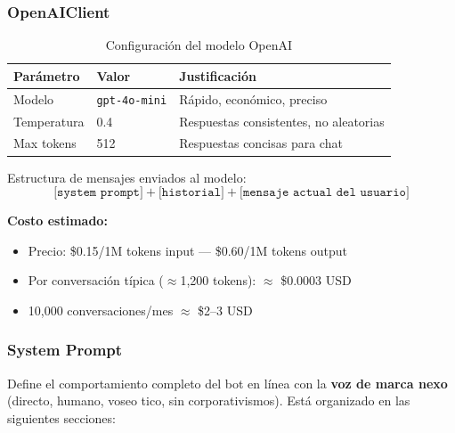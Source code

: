 \documentclass[12pt,a4paper]{article}
\begin{document}
\subsubsection*{OpenAIClient}

\begin{table}[H]
\centering
\begin{tabular}{@{}lll@{}}
\toprule
\textbf{Parámetro} & \textbf{Valor} & \textbf{Justificación} \\
\midrule
Modelo & \texttt{gpt-4o-mini} & Rápido, económico, preciso \\
Temperatura & 0.4 & Respuestas consistentes, no aleatorias \\
Max tokens & 512 & Respuestas concisas para chat \\
\bottomrule
\end{tabular}
\caption{Configuración del modelo OpenAI}
\end{table}

Estructura de mensajes enviados al modelo:
\[\texttt{[system prompt]} + \texttt{[historial]} + \texttt{[mensaje actual del usuario]}\]

\textbf{Costo estimado:}
\begin{itemize}
  \item Precio: \$0.15/1M tokens input — \$0.60/1M tokens output
  \item Por conversación típica ($\approx$1,200 tokens): $\approx$ \$0.0003 USD
  \item 10,000 conversaciones/mes $\approx$ \$2--3 USD
\end{itemize}

\subsubsection*{System Prompt}

Define el comportamiento completo del bot en línea con la \textbf{voz de marca nexo}
(directo, humano, voseo tico, sin corporativismos). Está organizado en las siguientes secciones:
\end{document}
